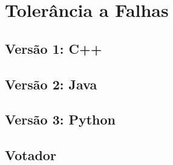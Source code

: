 \chapter{Tolerância a Falhas}
\label{cha:tolerancia_a_falhas}

\section{Versão 1: C++}
\label{sec:versao1_cpp}

\section{Versão 2: Java}
\label{sec:versao2_java}

\section{Versão 3: Python}
\label{sec:versao3_python}

\section{Votador}
\label{sec:votador}

